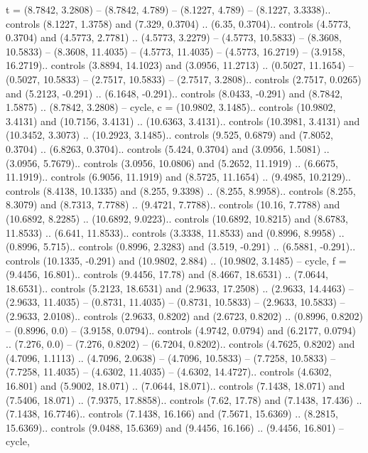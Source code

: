 {t} = {(8.7842, 3.2808) -- (8.7842, 4.789) -- (8.1227, 4.789) -- (8.1227, 3.3338).. controls (8.1227, 1.3758) and (7.329, 0.3704) .. (6.35, 0.3704).. controls (4.5773, 0.3704) and (4.5773, 2.7781) .. (4.5773, 3.2279) -- (4.5773, 10.5833) -- (8.3608, 10.5833) -- (8.3608, 11.4035) -- (4.5773, 11.4035) -- (4.5773, 16.2719) -- (3.9158, 16.2719).. controls (3.8894, 14.1023) and (3.0956, 11.2713) .. (0.5027, 11.1654) -- (0.5027, 10.5833) -- (2.7517, 10.5833) -- (2.7517, 3.2808).. controls (2.7517, 0.0265) and (5.2123, -0.291) .. (6.1648, -0.291).. controls (8.0433, -0.291) and (8.7842, 1.5875) .. (8.7842, 3.2808) -- cycle},
{c} = {(10.9802, 3.1485).. controls (10.9802, 3.4131) and (10.7156, 3.4131) .. (10.6363, 3.4131).. controls (10.3981, 3.4131) and (10.3452, 3.3073) .. (10.2923, 3.1485).. controls (9.525, 0.6879) and (7.8052, 0.3704) .. (6.8263, 0.3704).. controls (5.424, 0.3704) and (3.0956, 1.5081) .. (3.0956, 5.7679).. controls (3.0956, 10.0806) and (5.2652, 11.1919) .. (6.6675, 11.1919).. controls (6.9056, 11.1919) and (8.5725, 11.1654) .. (9.4985, 10.2129).. controls (8.4138, 10.1335) and (8.255, 9.3398) .. (8.255, 8.9958).. controls (8.255, 8.3079) and (8.7313, 7.7788) .. (9.4721, 7.7788).. controls (10.16, 7.7788) and (10.6892, 8.2285) .. (10.6892, 9.0223).. controls (10.6892, 10.8215) and (8.6783, 11.8533) .. (6.641, 11.8533).. controls (3.3338, 11.8533) and (0.8996, 8.9958) .. (0.8996, 5.715).. controls (0.8996, 2.3283) and (3.519, -0.291) .. (6.5881, -0.291).. controls (10.1335, -0.291) and (10.9802, 2.884) .. (10.9802, 3.1485) -- cycle},
{f} = {(9.4456, 16.801).. controls (9.4456, 17.78) and (8.4667, 18.6531) .. (7.0644, 18.6531).. controls (5.2123, 18.6531) and (2.9633, 17.2508) .. (2.9633, 14.4463) -- (2.9633, 11.4035) -- (0.8731, 11.4035) -- (0.8731, 10.5833) -- (2.9633, 10.5833) -- (2.9633, 2.0108).. controls (2.9633, 0.8202) and (2.6723, 0.8202) .. (0.8996, 0.8202) -- (0.8996, 0.0) -- (3.9158, 0.0794).. controls (4.9742, 0.0794) and (6.2177, 0.0794) .. (7.276, 0.0) -- (7.276, 0.8202) -- (6.7204, 0.8202).. controls (4.7625, 0.8202) and (4.7096, 1.1113) .. (4.7096, 2.0638) -- (4.7096, 10.5833) -- (7.7258, 10.5833) -- (7.7258, 11.4035) -- (4.6302, 11.4035) -- (4.6302, 14.4727).. controls (4.6302, 16.801) and (5.9002, 18.071) .. (7.0644, 18.071).. controls (7.1438, 18.071) and (7.5406, 18.071) .. (7.9375, 17.8858).. controls (7.62, 17.78) and (7.1438, 17.436) .. (7.1438, 16.7746).. controls (7.1438, 16.166) and (7.5671, 15.6369) .. (8.2815, 15.6369).. controls (9.0488, 15.6369) and (9.4456, 16.166) .. (9.4456, 16.801) -- cycle},
